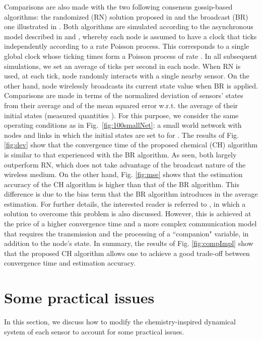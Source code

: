 \documentclass[journal]{IEEEtran}
\begin{document}
{Comparisons are also made with the two following consensus gossip-based algorithms: the randomized (RN) solution proposed in \cite{BoGh06} and the broadcast (BR) one illustrated in \cite{AyYi09}. Both algorithms are simulated according to the asynchronous model described in \cite{BoGh06} and \cite{AyYi09}, whereby each node is assumed to have a clock that ticks independently according to a rate  Poisson process. This corresponds to a single global clock whose ticking times form a Poisson process of rate  \cite{AyYi09}. In all subsequent simulations, we set an average of  ticks per second in each node. When RN is used, at each tick, node  randomly interacts with a single nearby sensor. On the other hand, node  wirelessly broadcasts its current state value when BR is applied.} {Comparisons are made in terms of the normalized deviation of sensors' states from their average and of the mean squared error w.r.t. the average of their initial states (measured quantities ). 
}
{For this purpose, we consider the same operating conditions as in Fig.~\ref{fig:100smallNet}: a small world network with  nodes and  links in which the initial states are set to  for .} {The results of Fig. \ref{fig:dev} show that the convergence time of the proposed chemical (CH) algorithm is similar to that experienced with the BR algorithm. As seen, both largely outperform RN, which does not take advantage of the broadcast nature of the wireless medium. On the other hand, Fig. \ref{fig:mse} shows that the estimation accuracy of the CH algorithm is higher than that of the BR algorithm. This difference is due to the bias term that the BR algorithm introduces in the average estimation. For further details, the interested reader is referred to \cite{ShRa13}, in which a solution to overcome this problem is also discussed. However, this is achieved at the price of a higher convergence time and a more complex communication model that requires the transmission and the processing of a ``companion" variable, in addition to the node's state.} 
{In summary, the results of Fig. \ref{fig:compImpl} show that the proposed CH algorithm allows one to achieve a good trade-off between convergence time and estimation accuracy.}




\section{Some practical issues}\label{sec:Robustness}
{
In this section, {we discuss how to modify the chemistry-inspired dynamical system} of each sensor to account for some practical issues. 
}
\end{document}
